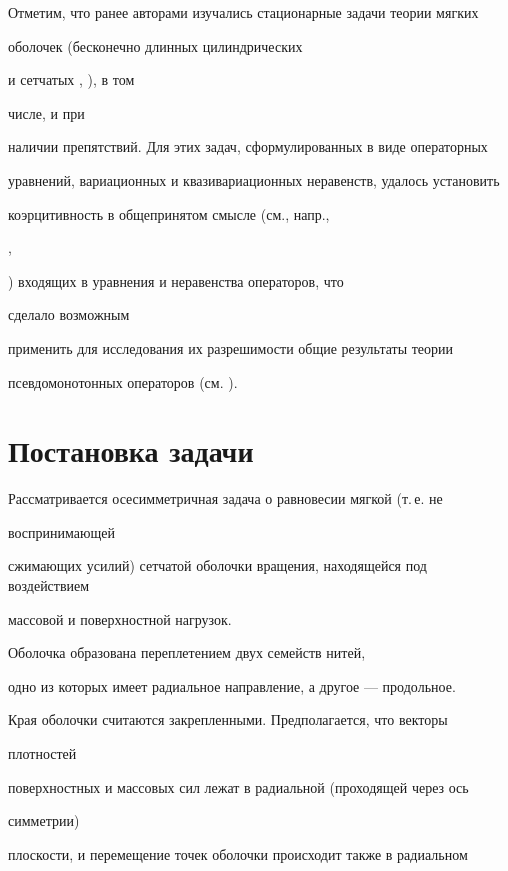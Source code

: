 Отметим, что ранее авторами изучались стационарные задачи теории мягких


оболочек (бесконечно длинных цилиндрических \cite{BS_91IV}


и сетчатых \cite{bz_Iz05_BZ_92IV}, \cite{bz_Iz05_Zad_2003_IzV}), в том


числе, и при


наличии препятствий. Для этих задач, сформулированных в виде операторных


уравнений, вариационных и квазивариационных неравенств, удалось установить


коэрцитивность в общепринятом смысле (см., напр.,


\cite{bz_Iz05_Lio_72},


\cite{bz_Iz05_ET_79}) входящих в уравнения и неравенства операторов, что


сделало возможным


применить для исследования их разрешимости общие результаты теории


псевдомонотонных операторов (см. \cite{bz_Iz05_Lio_72}).








\section{Постановка задачи}





Рассматривается осесимметричная задача о равновесии мягкой (т.\,е. не


воспринимающей


сжимающих усилий) сетчатой оболочки вращения, находящейся под воздействием


массовой и поверхностной нагрузок.


Оболочка образована переплетением двух семейств нитей,


одно из которых имеет радиальное направление, а другое --- продольное.


Края оболочки считаются закрепленными. Предполагается, что векторы


плотностей


поверхностных и массовых сил лежат в радиальной (проходящей через ось


симметрии)


плоскости, и перемещение точек оболочки происходит также в радиальном


